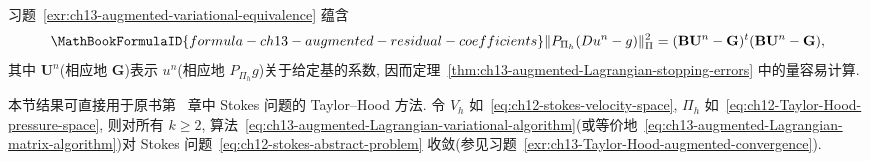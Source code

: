 习题~\ref{exr:ch13-augmented-variational-equivalence} 蕴含
\[
\MathBookFormulaID{formula-ch13-augmented-residual-coefficients}
\|P_{\Pi_h}(Du^n-g)\|_\Pi^2
=(\mathbf B\mathbf U^n-\mathbf G)^t(\mathbf B\mathbf U^n-\mathbf G),
\]
其中 $\mathbf U^n$(相应地 $\mathbf G$)表示 $u^n$(相应地 $P_{\Pi_h}g$)关于给定基的系数, 因而定理~\ref{thm:ch13-augmented-Lagrangian-stopping-errors} 中的量容易计算.

本节结果可直接用于原书第~ 章中 Stokes 问题的 Taylor--Hood 方法. 令 $V_h$ 如~\eqref{eq:ch12-stokes-velocity-space}, $\Pi_h$ 如~\eqref{eq:ch12-Taylor-Hood-pressure-space}, 则对所有 $k\geq2$, 算法~\eqref{eq:ch13-augmented-Lagrangian-variational-algorithm}(或等价地~\eqref{eq:ch13-augmented-Lagrangian-matrix-algorithm})对 Stokes 问题~\eqref{eq:ch12-stokes-abstract-problem} 收敛(参见习题~\ref{exr:ch13-Taylor-Hood-augmented-convergence}).
